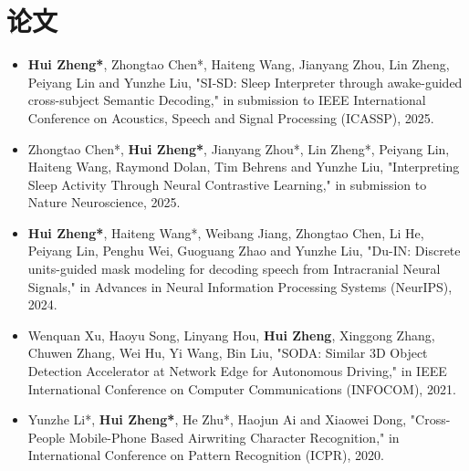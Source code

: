 \documentclass{resume}
\begin{document}
\section{{\bfseries 论文}}
\begin{itemize}[parsep=0.2ex]
  \item \textbf{Hui Zheng*}, Zhongtao Chen*, Haiteng Wang, Jianyang Zhou, Lin Zheng, Peiyang Lin and Yunzhe Liu, "SI-SD: Sleep Interpreter through awake-guided cross-subject Semantic Decoding," in submission to IEEE International Conference on Acoustics, Speech and Signal Processing (ICASSP), 2025.
  \item Zhongtao Chen*, \textbf{Hui Zheng*}, Jianyang Zhou*, Lin Zheng*, Peiyang Lin, Haiteng Wang, Raymond Dolan, Tim Behrens and Yunzhe Liu, "Interpreting Sleep Activity Through Neural Contrastive Learning," in submission to Nature Neuroscience, 2025.
  \item \textbf{Hui Zheng*}, Haiteng Wang*, Weibang Jiang, Zhongtao Chen, Li He, Peiyang Lin, Penghu Wei, Guoguang Zhao and Yunzhe Liu, "Du-IN: Discrete units-guided mask modeling for decoding speech from Intracranial Neural Signals," in Advances in Neural Information Processing Systems (NeurIPS), 2024.
  \item Wenquan Xu, Haoyu Song, Linyang Hou, \textbf{Hui Zheng}, Xinggong Zhang, Chuwen Zhang, Wei Hu, Yi Wang, Bin Liu, "SODA: Similar 3D Object Detection Accelerator at Network Edge for Autonomous Driving," in IEEE International Conference on Computer Communications (INFOCOM), 2021.
  \item Yunzhe Li*, \textbf{Hui Zheng*}, He Zhu*, Haojun Ai and Xiaowei Dong, "Cross-People Mobile-Phone Based Airwriting Character Recognition," in International Conference on Pattern Recognition (ICPR), 2020.
\end{itemize}

\end{document}
